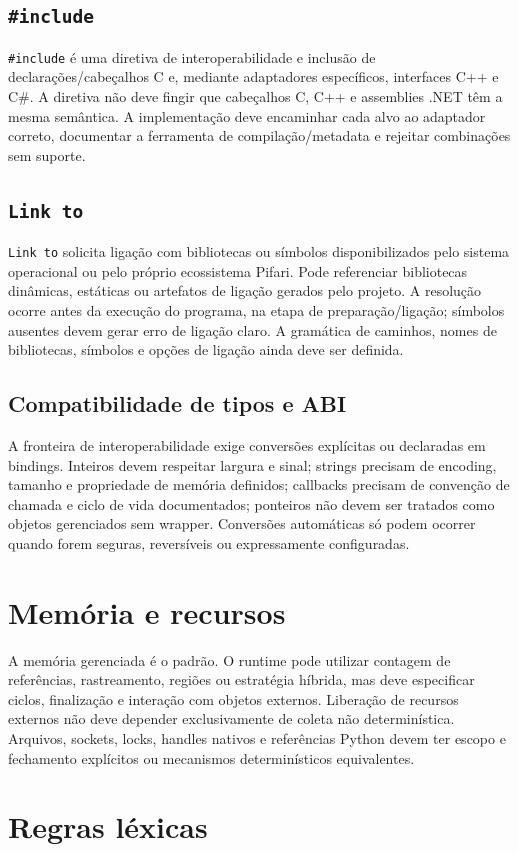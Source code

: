 \documentclass[12pt,a4paper]{article}
\begin{document}
\subsection{\texttt{\#include}}
\texttt{\#include} é uma diretiva de interoperabilidade e inclusão de declarações/cabeçalhos C e, mediante adaptadores específicos, interfaces C++ e C\#. A diretiva não deve fingir que cabeçalhos C, C++ e assemblies .NET têm a mesma semântica. A implementação deve encaminhar cada alvo ao adaptador correto, documentar a ferramenta de compilação/metadata e rejeitar combinações sem suporte.
\subsection{\texttt{Link to}}
\texttt{Link to} solicita ligação com bibliotecas ou símbolos disponibilizados pelo sistema operacional ou pelo próprio ecossistema Pifari. Pode referenciar bibliotecas dinâmicas, estáticas ou artefatos de ligação gerados pelo projeto. A resolução ocorre antes da execução do programa, na etapa de preparação/ligação; símbolos ausentes devem gerar erro de ligação claro. A gramática de caminhos, nomes de bibliotecas, símbolos e opções de ligação ainda deve ser definida.
\subsection{Compatibilidade de tipos e ABI}
A fronteira de interoperabilidade exige conversões explícitas ou declaradas em bindings. Inteiros devem respeitar largura e sinal; strings precisam de encoding, tamanho e propriedade de memória definidos; callbacks precisam de convenção de chamada e ciclo de vida documentados; ponteiros não devem ser tratados como objetos gerenciados sem wrapper. Conversões automáticas só podem ocorrer quando forem seguras, reversíveis ou expressamente configuradas.
\section{Memória e recursos}
A memória gerenciada é o padrão. O runtime pode utilizar contagem de referências, rastreamento, regiões ou estratégia híbrida, mas deve especificar ciclos, finalização e interação com objetos externos. Liberação de recursos externos não deve depender exclusivamente de coleta não determinística. Arquivos, sockets, locks, handles nativos e referências Python devem ter escopo e fechamento explícitos ou mecanismos determinísticos equivalentes.
\section{Regras léxicas}
\end{document}
